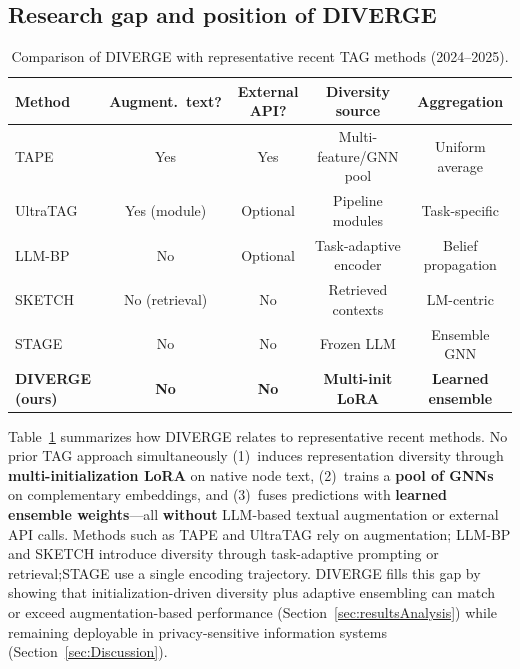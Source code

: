 \documentclass[a4paper,fleqn]{cas-sc}
\begin{document}
\subsection{Research gap and position of DIVERGE}

\begin{table}[htbp]
\centering
\caption{Comparison of DIVERGE with representative recent TAG methods (2024--2025).}
\label{tab:related_gap}
\small
\begin{tabular*}{\linewidth}{@{\extracolsep{\fill}} lcccc @{}}
\toprule
\textbf{Method} & \textbf{Augment.\ text?} & \textbf{External API?} & \textbf{Diversity source} & \textbf{Aggregation} \\
\midrule
TAPE \citep{he2024harnessing} & Yes & Yes & Multi-feature/GNN pool & Uniform average \\
UltraTAG \citep{yu2025ultratag} & Yes (module) & Optional & Pipeline modules & Task-specific \\
LLM-BP \citep{wang2025llmbp} & No & Optional & Task-adaptive encoder & Belief propagation \\
SKETCH \citep{zhou-etal-2025sketch} & No (retrieval) & No & Retrieved contexts & LM-centric \\
STAGE \citep{zolnai-lucas-etal-2024-stage} & No & No & Frozen LLM & Ensemble GNN \\
\textbf{DIVERGE (ours)} & \textbf{No} & \textbf{No} & \textbf{Multi-init LoRA} & \textbf{Learned ensemble} \\
\bottomrule
\end{tabular*}
\end{table}

Table~\ref{tab:related_gap} summarizes how DIVERGE relates to representative recent methods. No prior TAG approach simultaneously (1)~induces representation diversity through \textbf{multi-initialization LoRA} on native node text, (2)~trains a \textbf{pool of GNNs} on complementary embeddings, and (3)~fuses predictions with \textbf{learned ensemble weights}---all \textbf{without} LLM-based textual augmentation or external API calls. Methods such as TAPE and UltraTAG rely on augmentation; LLM-BP and SKETCH introduce diversity through task-adaptive prompting or retrieval;STAGE use a single encoding trajectory. DIVERGE fills this gap by showing that initialization-driven diversity plus adaptive ensembling can match or exceed augmentation-based performance (Section~\ref{sec:resultsAnalysis}) while remaining deployable in privacy-sensitive information systems (Section~\ref{sec:Discussion}).
\end{document}
